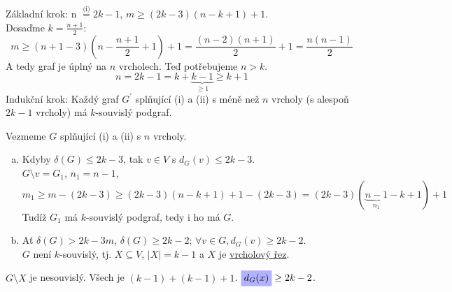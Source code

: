 Základní krok: n $\stackrel{\text{(i)}}{=}2k-1$, $m \geq (2k-3)(n-k+1)+1$.\\
Dosaďme $k = \frac{n+1}{2}$:
\begin{equation}
    m \geq (n+1-3)\left(n-\frac{n+1}{2}+1\right)+1 = \frac{(n-2)(n+1)}{2}+1 = \frac{n(n-1)}{2}
\end{equation}
A tedy graf je úplný na $n$ vrcholech. Teď potřebujeme $n>k$.
\begin{equation}
    n = 2k-1 = k + \underbrace{k-1}_{\geq 1} \geq k+1
\end{equation}
Indukční krok: Každý graf $G^\prime$ splňující (i) a (ii) s méně než $n$ vrcholy (s alespoň $2k-1$ vrcholy) má 
$k$-souvislý podgraf.

Vezmeme $G$ splňující (i) a (ii) s $n$ vrcholy.
\begin{enumerate}[(a)]
    \item Kdyby $\delta(G) \leq 2k-3$, tak $v \in V$ s $d_G(v) \leq 2k-3$.\\
    $G \setminus v = G_1$, $n_1=n-1$,
    \begin{equation*}
        m_1 \geq m-(2k-3) \geq (2k-3)(n-k+1)+1 - (2k-3) = (2k-3)(\underbrace{n-1}_{n_1}-k+1)+1
    \end{equation*}
    Tudíž $G_1$ má $k$-souvislý podgraf, tedy i ho má $G$.
    \item Ať $\delta(G) > 2k-3m$, $\delta(G) \geq 2k-2$; $\forall v \in G, d_G(v)\geq 2k-2$.\\
    $G$ není $k$-souvislý, tj. $X \subseteq V$, $|X|=k-1$ a $X$ je \hyperref[vrchRez]{vrcholový řez}.
\end{enumerate}

\begin{figure}[H]
    \centering
\end{figure}
$G \setminus X$ je nesouvislý. Všech je $(k-1) + (k-1) + 1$. $\colorbox{blue!30}{$d_G(x)$} \geq 2k - 2$.

